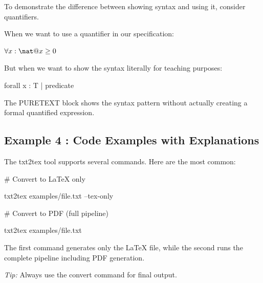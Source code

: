 \documentclass[a4paper,10pt,fleqn]{article}
\begin{document}
\noindent To demonstrate the difference between showing syntax and using it, consider quantifiers.

\bigskip

\noindent When we want to use a quantifier in our specification:

\bigskip

\noindent
$\forall x : \nat @ x \geq 0$


\noindent But when we want to show the syntax literally for teaching purposes:

\bigskip

\bigskip

forall x : T | predicate

\bigskip

\noindent The PURETEXT block shows the syntax pattern without actually creating a formal quantified expression.

\bigskip

\subsection*{Example 4 : Code Examples with Explanations}

\noindent The txt2tex tool supports several commands. Here are the most common:

\bigskip

\bigskip

\# Convert to LaTeX only

\bigskip

\bigskip

txt2tex examples/file.txt --tex-only

\bigskip

\bigskip



\bigskip

\bigskip

\# Convert to PDF (full pipeline)

\bigskip

\bigskip

txt2tex examples/file.txt

\bigskip

\noindent The first command generates only the LaTeX file, while the second runs the complete pipeline including PDF generation.

\bigskip

\medskip\noindent\textit{Tip:} Always use the convert command for final output.
\end{document}
